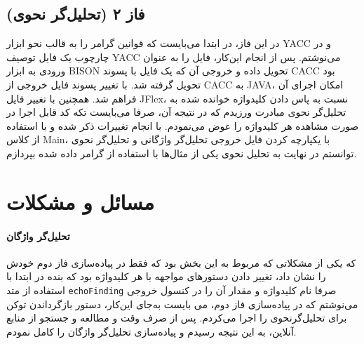 \documentclass{article}
\theoremstyle{definition}
\begin{document}
	\subsection{فاز ۲ (تحلیل‌گر نحوی)}
	در این فاز، در ابتدا می‌بایست که قوانین گرامر را به قالب نحو ابزار YACC و در چارچوب یک فایل توصیف YACC می‌نوشتم. پس از انجام این‌کار، فایل را به عنوان ورودی به ابزار BISON‌ تحویل داده و خروجی آن که یک فایل با پسوند CACC‌ بود تحویل گرفته شد. با تغییر پسوند فایل خروجی از CACC به JAVA، امکان اجرای آن فراهم شد. همچنین با تغییر فایل JFlex، نسبت به پاس دادن کلیدواژه خوانده شده به تحلیل‌گر نحوی مبادرت ورزیدم که در نتیجه آن، صرفا می‌بایست تکه کد قابل اجرا در صورت مشاهده هر کلیدواژه را عوض می‌نمودم. با انجام تغییرات ذکر شده و با استفاده از کلاس Main، با یکپارچه کردن فایل خروجی تحلیل‌گر واژگانی و تحلیل‌گر نحوی توانستم در نهایت به تحلیل نحوی یکی از مثال‌ها با استفاده از گرامر داده شده بپردازم.
	\section{مسائل و مشکلات}
	\paragraph{تحلیل‌گر واژگان}
	که یکی از مشکلاتی که مربوط به این بخش بود که فقط در پیاده‌سازی فاز دوم خودش را نشان داد، تغییر دادن دستورهای مواجهه با هر کلیدواژه بود که بنده در ابتدا با استفاده از متد
	\texttt{echoFinding}
	صرفا نام کلیدواژه و مقدار آن را در کنسول خروجی می‌نوشتم که در پیاده‌سازی فاز دوم، می بایست به‌جای این‌کار، دستور بازگرداندن توکن برای تحلیل‌گرنحوی را اجرا می‌کردم. پس از صرف وقت و مطالعه و جستجو از منابع آنلاین، به این نتیجه رسیدم و پیاده‌سازی تحلیل‌گر واژگان را کامل نمودم.
\end{document}
